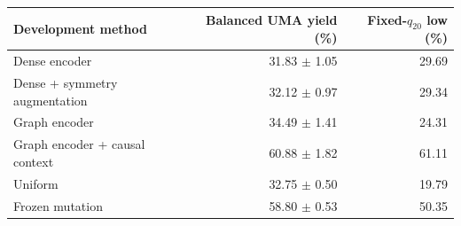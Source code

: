 \begin{center}\small
\begin{tabular}{lrr}
\toprule
Development method & Balanced UMA yield (\%) & Fixed-$q_{20}$ low (\%)\\
\midrule
Dense encoder & 31.83 $\pm$ 1.05 & 29.69\\
Dense + symmetry augmentation & 32.12 $\pm$ 0.97 & 29.34\\
Graph encoder & 34.49 $\pm$ 1.41 & 24.31\\
Graph encoder + causal context & 60.88 $\pm$ 1.82 & 61.11\\
Uniform & 32.75 $\pm$ 0.50 & 19.79\\
Frozen mutation & 58.80 $\pm$ 0.53 & 50.35\\
\bottomrule
\end{tabular}
\end{center}
